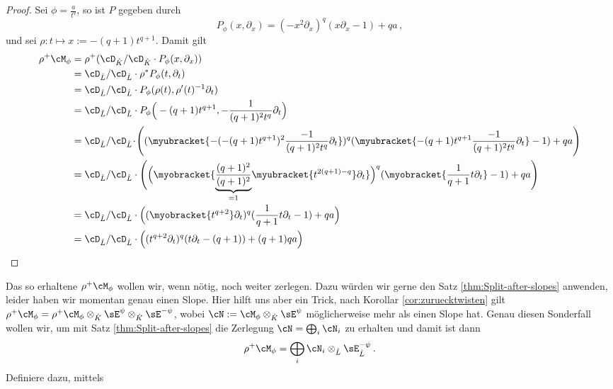 \begin{proof}
Sei $\phi=\frac{a}{t^{q}}$, so ist $P$ gegeben durch
\[
P_{\phi}(x,\partial_x) =(-x^2\partial_x)^{q} (x\partial_x-1)+qa \,,
\]
und sei $\rho:t\mapsto x:=-(q+1) t^{q+1}$. Damit gilt
\begin{align*}
\rho^+\cM_\phi &= \rho^+(\cD_{\hat K}/\cD_{\hat K}\cdot P_\phi(x,\partial_x))\\
  &=\cD_{\hat L}/\cD_{\hat L}\cdot\rho^*P_\phi(t,\partial_t)\\
  &=\cD_{\hat L}/\cD_{\hat L}\cdot P_\phi(\rho(t),\rho'(t)^{-1}\partial_t)\\
  &=\cD_{\hat L}/\cD_{\hat L}
    \cdot P_\phi\Big(-(q+1) t^{q+1},-\frac{1}{(q+1)^2t^q}\partial_t\Big)\\
  &=\cD_{\hat L}/\cD_{\hat L} \!\cdot\! \Bigg((\myubracket{
    -(-(q+1) t^{q+1})^2\frac{-1}{(q+1)^2t^{q}}\partial_t})^{q}
    (\myubracket{-(q+1) t^{q+1}\frac{-1}{(q+1)^2t^{q}}\partial_t}-1)
    +qa\Bigg)\\
  &=\cD_{\hat L}/\cD_{\hat L}
    \cdot\Bigg(\Big(\myobracket{
      \underset{=1}{\underbrace{\frac{(q+1)^2}{(q+1)^2}}}
      \myubracket{t^{2(q+1)-q}}\partial_t}\Big)^{q}
    (\myobracket{\frac{1}{q+1}t\partial_t}-1)+qa\Bigg)\\
  &=\cD_{\hat L}/\cD_{\hat L}
    \cdot\Big((\myobracket{t^{q+2}}\partial_t)^{q}
    (\frac{1}{q+1}t\partial_t-1)+qa\Big)\\
  &=\cD_{\hat L}/\cD_{\hat L}
    \cdot\Big((t^{q+2}\partial_t)^{q}
    (t\partial_t-(q+1))+(q+1)qa\Big)
\end{align*}
\end{proof}
\begin{comment}
\begin{cor}
Ordnung vom pull-back ist $0$
\end{cor}
\end{comment}
Das so erhaltene $\rho^+\cM_\phi$ wollen wir, wenn nötig, noch weiter
zerlegen. Dazu würden wir gerne den Satz \ref{thm:Split-after-slopes} anwenden,
leider haben wir momentan genau einen Slope.
Hier hilft uns aber ein Trick, nach Korollar \ref{cor:zuruecktwisten} gilt
$
\rho^+\cM_{\phi}
  =\rho^+\cM_{\phi}\otimes_{\hat K}\sE^{\psi}\otimes_{\hat K}\sE^{-\psi}
$,
wobei $\cN:=\cM_{\phi}\otimes_{\hat K}\sE^{\psi}$ möglicherweise mehr als
einen Slope hat. Genau diesen Sonderfall wollen wir, um mit Satz
\ref{thm:Split-after-slopes} die Zerlegung $\cN=\bigoplus_i\cN_i$ zu erhalten
und damit ist dann
\[
\rho^+\cM_{\phi}=\bigoplus_i\cN_i\otimes_{\hat L}\sE^{-\psi}_{\hat L} \,.
\]
Definiere dazu, mittels
